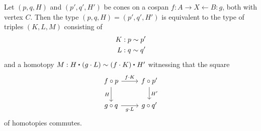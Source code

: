 \begin{lem}\label{lem:id_cone}%
%
Let $(p,q,H)$ and $(p',q',H')$ be cones on a cospan $f:A\rightarrow X \leftarrow B:g$, both with vertex $C$. Then the type $(p,q,H)=(p',q',H')$ is equivalent to the type of triples $(K,L,M)$ consisting of
\begin{align*}
K & : p \sim p' \\
L & : q \sim q'
\end{align*}
and a homotopy $M : \ct{H}{(g\cdot L)} \htpy \ct{(f\cdot K)}{H'}$ witnessing that the square
\begin{equation*}
\begin{tikzcd}
f\circ p \arrow[r,"f\cdot K"] \arrow[d,swap,"H"] & f\circ p' \arrow[d,"{H'}"] \\
g\circ q \arrow[r,swap,"g\cdot L"] & g\circ q'
\end{tikzcd}
\end{equation*}
of homotopies commutes.
\end{lem}

\begin{comment}
\begin{rmk}
The homotopy $M$ is a homotopy of homotopies, and for each $z:C$ the identification $M(z)$ witnesses that the square of identifications
\begin{equation*}
\begin{tikzcd}[column sep=huge]
f(p(z)) \arrow[r,equals,"\ap{f}{K(z)}"] \arrow[d,equals,swap,"H(z)"] & f(p'(z)) \arrow[d,equals,"{H'(z)}"] \\
g(q(z)) \arrow[r,equals,swap,"\ap{g}{L(z)}"] & g(q'(z))
\end{tikzcd}
\end{equation*}
commutes. 
\end{rmk}
\end{comment}

